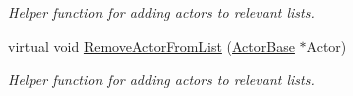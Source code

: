 \begin{DoxyCompactItemize}
\begin{DoxyCompactList}\small\item\em Helper function for adding actors to relevant lists. \item\end{DoxyCompactList}\item 
\hypertarget{classphys_1_1AreaEffect_a98bf156da3c7f8bb98d5ce9d37b6aa0f}{
virtual void \hyperlink{classphys_1_1AreaEffect_a98bf156da3c7f8bb98d5ce9d37b6aa0f}{RemoveActorFromList} (\hyperlink{classphys_1_1ActorBase}{ActorBase} $\ast$Actor)}
\label{d4/d55/classphys_1_1AreaEffect_a98bf156da3c7f8bb98d5ce9d37b6aa0f}

\begin{DoxyCompactList}\small\item\em Helper function for adding actors to relevant lists. \item\end{DoxyCompactList}\end{DoxyCompactItemize}
